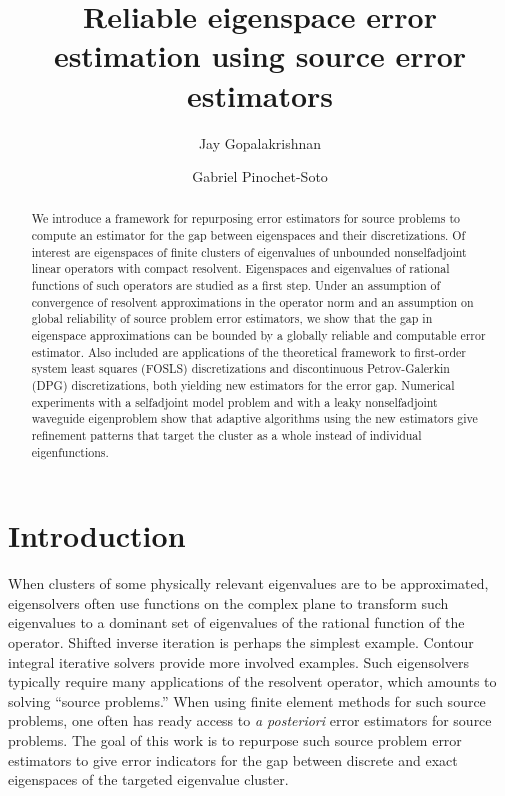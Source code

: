 \documentclass[12pt, oneside, reqno]{amsart}
\title[Estimators for eigenspace error]{
  Reliable eigenspace error estimation using source error estimators}
\author{Jay Gopalakrishnan \and Gabriel Pinochet-Soto}
\theoremstyle{remark}
\begin{document}
\begin{abstract}
  We introduce a framework for repurposing error estimators for source
  problems to compute an estimator for the gap between eigenspaces and their
  discretizations. Of interest are eigenspaces of finite
  clusters of eigenvalues of unbounded nonselfadjoint linear operators
  with compact resolvent.  Eigenspaces and eigenvalues of rational
  functions of such operators are studied as a  first step.
  Under an assumption of convergence of resolvent approximations in
  the operator norm and an assumption on global reliability of source
  problem error estimators, we show that the gap in eigenspace
  approximations can be bounded by a globally reliable and computable
  error estimator. Also included are applications of the theoretical
  framework to first-order system least squares
  (FOSLS) discretizations and discontinuous Petrov-Galerkin (DPG)
  discretizations, both yielding new estimators for the error gap.
  Numerical experiments with a selfadjoint model problem and with a
  leaky nonselfadjoint  waveguide eigenproblem show that adaptive algorithms
  using the new estimators give refinement patterns
  that target the cluster as a whole instead of  individual eigenfunctions.


\end{abstract}

\maketitle

\section{Introduction} 

When clusters of some physically relevant eigenvalues are to be approximated,
eigensolvers  often use
functions on  the complex plane to transform such eigenvalues to a dominant set of
eigenvalues of the rational function of the operator. Shifted inverse
iteration is perhaps the simplest example. Contour
integral iterative solvers provide more involved examples. Such eigensolvers
typically require many applications of the resolvent operator, which amounts
to solving ``source problems.''  When using
finite element methods for such source problems, one often has ready
access to {\em a posteriori} error estimators for source problems.
The goal of this work
is to repurpose such source problem error estimators to give error
indicators for the gap between discrete and exact eigenspaces of the
targeted eigenvalue cluster.
\end{document}
